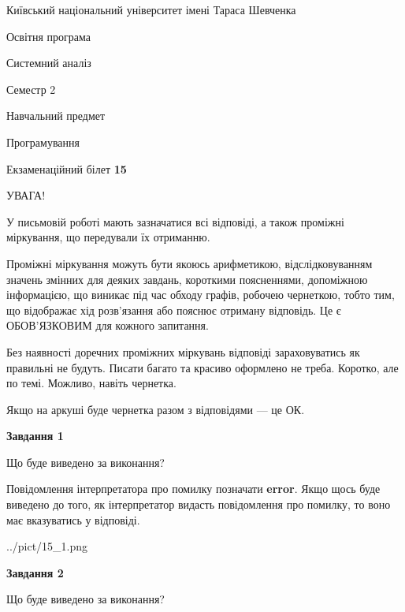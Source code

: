 \documentclass[12pt, ukrainian]{article}
\begin{document}
{{\begin {small}\par
{ \center  Київський національний університет імені Тараса Шевченка \par}
{\parbox {5 cm}{Освітня програма \hfill}{\parbox {7 cm}{Системний аналіз \hfill}}\parbox {6 cm}{\hfill Семестр 2}}\par
{\parbox {5 cm} {Навчальний предмет \hfill}\parbox {7 cm}{Програмування \hfill}\parbox {6cm}{\hfill}\par}\vspace{-7pt} \end{small}}{\center Екзаменаційний білет \No \textbf
{ 15 }\par}}
{
\begin {large}
УВАГА!

У письмовій роботі мають зазначатися всі відповіді, а також проміжні міркування, що передували їх отриманню.

Проміжні міркування можуть бути якоюсь арифметикою, відслідковуванням зна\-чень змінних для деяких завдань,
короткими поясненнями, допоміжною інформацією, що виникає під час обходу графів, робочею чернеткою,
тобто тим, що відображає хід розв’язання або пояснює отриману відповідь.
Це є ОБОВ’ЯЗКОВИМ для кожного запитання.

Без наявності доречних проміжних міркувань відповіді зараховуватись як правиль\-ні не будуть.
Писати багато та красиво оформлено не треба. Коротко, але по темі. Можли\-во, навіть чернетка.

Якщо на аркуші буде чернетка разом з відповідями --- це ОК.

\newpage

{\begin {center}\textbf{Завдання 1}\end {center}}\par
Що буде виведено за виконання?

Повідомлення інтерпретатора про помилку позначати \textbf{error}.
Якщо щось буде виведено до того, як інтерпретатор видасть повідомлення про помилку, 
то воно має вказуватись у відповіді. \par


\begin{center}
	{../pict/15_1.png}
\end{center}
\newpage

{\begin {center}\textbf{Завдання 2}\end {center}}\par
Що буде виведено за виконання?


\end{large}}
\end{document}
